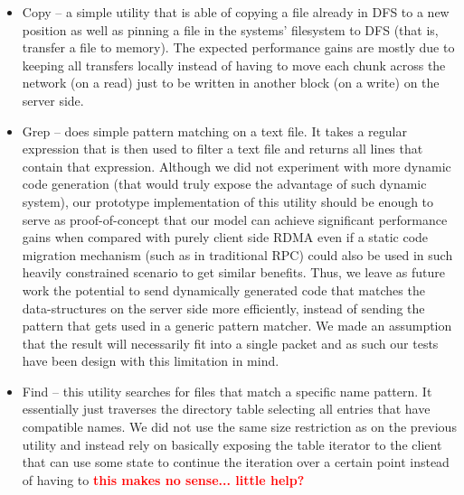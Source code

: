 \documentclass[10pt]{article}
\newcommand{\PROBLEM}[1] {\textbf{\textcolor{red}{#1}}}
\begin{document}
\begin{itemize}
\item Copy -- a simple utility that is able of copying a file already in DFS to a new position as well as pinning a file in the systems' filesystem to DFS (that is, transfer a file to memory). The expected performance gains are mostly due to keeping all transfers locally instead of having to move each chunk across the network (on a read) just to be written in another block (on a write) on the server side.

\item Grep -- does simple pattern matching on a text file. It takes a regular expression that is then used to filter a text file and returns all lines that contain that expression. Although we did not experiment with more dynamic code generation (that would truly expose the advantage of such dynamic system), our prototype implementation of this utility should be enough to serve as proof-of-concept that our model can achieve significant performance gains when compared with purely client side RDMA even if a static code migration mechanism (such as in traditional RPC) could also be used in such heavily constrained scenario to get similar benefits. Thus, we leave as future work the potential to send dynamically generated code that matches the data-structures on the server side more efficiently, instead of sending the pattern that gets used in a generic pattern matcher. 
We made an assumption that the result will necessarily fit into a single packet and as such our tests have been design with this limitation in mind.

\item Find -- this utility searches for files that match a specific name pattern. It essentially just traverses the directory table selecting all entries that have compatible names. We did not use the same size restriction as on the previous utility and instead rely on basically exposing the table iterator to the client that can use some state to continue the iteration over a certain point instead of having to \PROBLEM{this makes no sense... little help?}

\end{itemize}
\end{document}

